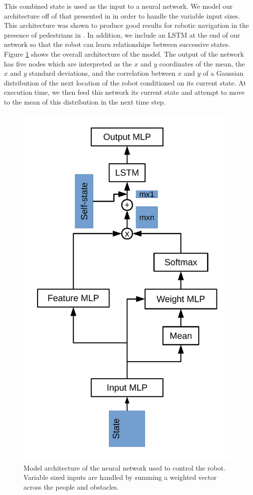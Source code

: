 \documentclass[letterpaper, 10 pt, conference]{ieeeconf}  %
\begin{document}
	This combined state is used as the input to a neural network. We model our architecture off of that presented in \cite{crowdawarerl} in order to handle the variable input sizes. This architecture was shown to produce good results for robotic navigation in the presence of pedestrians in \cite{crowdawarerl}. In addition, we include an LSTM at the end of our network so that the robot can learn relationships between successive states. Figure \ref{fig:model_arch} shows the overall architecture of the model. The output of the network has five nodes which are interpreted as the $x$ and $y$ coordinates of the mean, the $x$ and $y$ standard deviations, and the correlation between $x$ and $y$ of a Gaussian distribution of the next location of the robot conditioned on its current state. At execution time, we then feed this network its current state and attempt to move to the mean of this distribution in the next time step.
	
	\begin{figure}
		\centering
		\includegraphics[height=\linewidth, angle=270]{model_arch.pdf}
		\caption{Model architecture of the neural network used to control the robot. Variable sized inputs are handled by summing a weighted vector across the people and obstacles.}
		\label{fig:model_arch}
	\end{figure}
\end{document}
